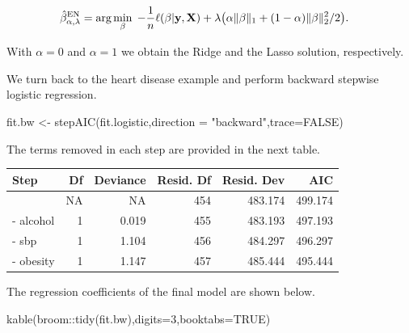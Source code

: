 \documentclass[
]{book}
\newenvironment{Shaded}{\begin{snugshade}}{\end{snugshade}}
\newcommand{\AttributeTok}[1]{\textcolor[rgb]{0.77,0.63,0.00}{#1}}
\newcommand{\ConstantTok}[1]{\textcolor[rgb]{0.00,0.00,0.00}{#1}}
\newcommand{\DecValTok}[1]{\textcolor[rgb]{0.00,0.00,0.81}{#1}}
\newcommand{\FunctionTok}[1]{\textcolor[rgb]{0.00,0.00,0.00}{#1}}
\newcommand{\NormalTok}[1]{#1}
\newcommand{\OtherTok}[1]{\textcolor[rgb]{0.56,0.35,0.01}{#1}}
\newcommand{\SpecialCharTok}[1]{\textcolor[rgb]{0.00,0.00,0.00}{#1}}
\newcommand{\StringTok}[1]{\textcolor[rgb]{0.31,0.60,0.02}{#1}}
\begin{document}
\begin{align*}
\hat{\beta}^{\rm EN}_{\alpha,\lambda}&=\text{arg}\min\limits_{\beta}\;-\frac{1}{n}\ell(\beta|{\bf y},{\bf X})+\lambda\big(\alpha\|\beta\|_1+(1-\alpha)\|\beta\|_2^2/2\big).
\end{align*}

With \(\alpha=0\) and \(\alpha=1\) we obtain the Ridge and the Lasso solution, respectively.

We turn back to the heart disease example and perform backward stepwise logistic regression.

\begin{Shaded}
\begin{Highlighting}[]
\NormalTok{fit.bw }\OtherTok{\textless{}{-}} \FunctionTok{stepAIC}\NormalTok{(fit.logistic,}\AttributeTok{direction =} \StringTok{"backward"}\NormalTok{,}\AttributeTok{trace=}\ConstantTok{FALSE}\NormalTok{)}
\end{Highlighting}
\end{Shaded}

The terms removed in each step are provided in the next table.

\begin{Shaded}
\end{Shaded}

\begin{tabular}{lrrrrr}
\toprule
Step & Df & Deviance & Resid. Df & Resid. Dev & AIC\\
\midrule
 & NA & NA & 454 & 483.174 & 499.174\\
- alcohol & 1 & 0.019 & 455 & 483.193 & 497.193\\
- sbp & 1 & 1.104 & 456 & 484.297 & 496.297\\
- obesity & 1 & 1.147 & 457 & 485.444 & 495.444\\
\bottomrule
\end{tabular}

The regression coefficients of the final model are shown below.

\begin{Shaded}
\begin{Highlighting}[]
\FunctionTok{kable}\NormalTok{(broom}\SpecialCharTok{::}\FunctionTok{tidy}\NormalTok{(fit.bw),}\AttributeTok{digits=}\DecValTok{3}\NormalTok{,}\AttributeTok{booktabs=}\ConstantTok{TRUE}\NormalTok{)}
\end{Highlighting}
\end{Shaded}
\end{document}
